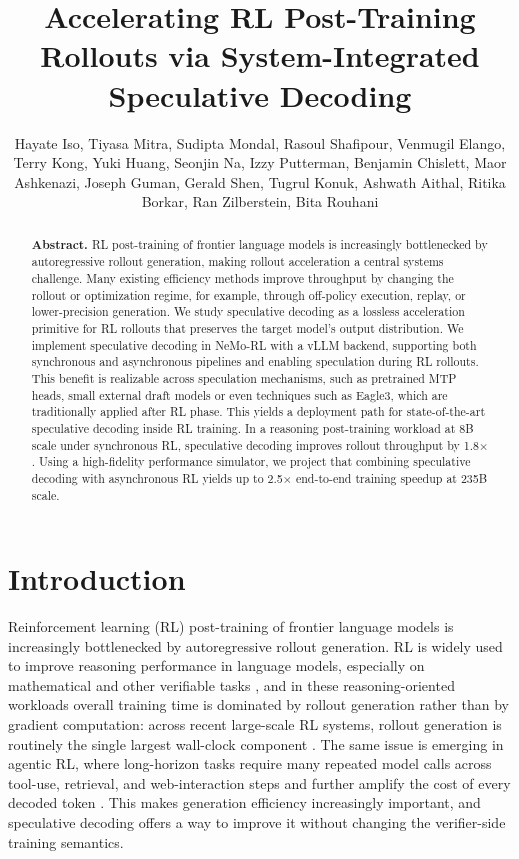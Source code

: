 \documentclass[11pt, logo, onecolumn, copyright, colorlinks=true, allcolors=blue]{nvidiatechreport}
\title{Accelerating RL Post-Training Rollouts via System-Integrated Speculative Decoding}
\author{Hayate Iso, Tiyasa Mitra, Sudipta Mondal, Rasoul Shafipour, Venmugil Elango, Terry Kong, Yuki Huang, Seonjin Na, Izzy Putterman, Benjamin Chislett, Maor Ashkenazi, Joseph Guman, Gerald Shen, Tugrul Konuk, Ashwath Aithal, Ritika Borkar, Ran Zilberstein, Bita Rouhani}
\date{}
\begin{document}
\begin{abstract}
\large \textbf{Abstract.}
RL post-training of frontier language models is increasingly bottlenecked by autoregressive rollout generation, making rollout acceleration a central systems challenge. Many existing efficiency methods improve throughput by changing the rollout or optimization regime, for example, through off-policy execution, replay, or lower-precision generation. We study speculative decoding as a lossless acceleration primitive for RL rollouts that preserves the target model's output distribution. We implement speculative decoding in NeMo-RL with a vLLM backend, supporting both synchronous and asynchronous pipelines and enabling speculation during RL rollouts. This benefit is realizable across speculation mechanisms, such as pretrained MTP heads, small external draft models or even techniques such as Eagle3, which are traditionally applied after RL phase. This yields a deployment path for state-of-the-art speculative decoding inside RL training. In a reasoning post-training workload at 8B scale under synchronous RL, speculative decoding improves rollout throughput by 1.8$\times$. Using a high-fidelity performance simulator, we project that combining speculative decoding with asynchronous RL yields up to 2.5$\times$ end-to-end training speedup at 235B scale.
\end{abstract}

\maketitle

\section{Introduction}

Reinforcement learning (RL) post-training of frontier language models is increasingly bottlenecked by autoregressive rollout generation. RL is widely used to improve reasoning performance in language models, especially on mathematical and other verifiable tasks \citep{shao2024deepseekmath,DeepSeekAI2025DeepSeekR1IR}, and in these reasoning-oriented workloads overall training time is dominated by rollout generation rather than by gradient computation: across recent large-scale RL systems, rollout generation is routinely the single largest wall-clock component \citep{shen2024nemoaligner,hu2024openrlhf,noukhovitch2024async,piche2025pipelinerl,meta2025llamarl}. The same issue is emerging in agentic RL, where long-horizon tasks require many repeated model calls across tool-use, retrieval, and web-interaction steps and further amplify the cost of every decoded token \citep{jin2025searchr1,qian2025toolrl,wang2025ragen,qi2025webrl}. This makes generation efficiency increasingly important, and speculative decoding offers a way to improve it without changing the verifier-side training semantics.
\end{document}
